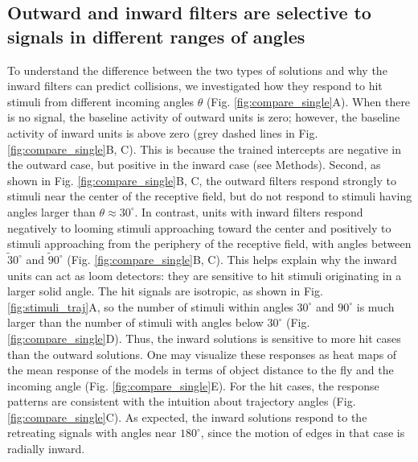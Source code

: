 \documentclass[pdftex,9pt,lineno]{elife}
\begin{document}
\begin{figure}
\end{figure}


\subsection{Outward and inward filters are selective to signals in different ranges of angles}

To understand the difference between the two types of solutions and why the inward filters can predict collisions, we investigated how they respond to hit stimuli from different incoming angles $\theta$ (Fig. \ref{fig:compare_single}A). When there is no signal, the baseline activity of outward units is zero; however, the baseline activity of inward units is above zero (grey dashed lines in Fig. \ref{fig:compare_single}B, C). This is because the trained intercepts are negative in the outward case, but positive in the inward case (see Methods). Second, as shown in Fig. \ref{fig:compare_single}B, C, the outward filters respond strongly to stimuli near the center of the receptive field, but do not respond to stimuli having angles larger than $\theta \approx 30^{\circ}$. In contrast, units with inward filters respond negatively to looming stimuli approaching toward the center and positively to stimuli approaching from the periphery of the receptive field, with angles between $\tilde 30^{\circ}$ and $\tilde 90^{\circ}$ (Fig. \ref{fig:compare_single}B, C). This helps explain why the inward units can act as loom detectors: they are sensitive to hit stimuli originating in a larger solid angle. The hit signals are isotropic, as shown in Fig. \ref{fig:stimuli_traj}A, so the number of stimuli within angles $30^{\circ}$ and $90^{\circ}$ is much larger than the number of stimuli with angles below $30^{\circ}$ (Fig. \ref{fig:compare_single}D). Thus, the inward solutions is sensitive to more hit cases than the outward solutions. One may visualize these responses as heat maps of the mean response of the models in terms of object distance to the fly and the incoming angle (Fig. \ref{fig:compare_single}E). For the hit cases, the response patterns are consistent with the intuition about trajectory angles (Fig. \ref{fig:compare_single}C). As expected, the inward solutions respond to the retreating signals with angles near $180^{\circ}$, since the motion of edges in that case is radially inward.
\end{document}
